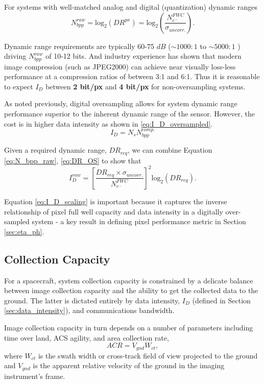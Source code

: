 \documentclass[10pt,journal]{IEEEtran}  %
\begin{document}
For systems with well-matched analog and digital (quantization) dynamic ranges
\begin{equation}
	\label{eq:N_bpp_raw}
    N_{bpp}^{raw} = \textrm{log}_2(DR^{px}) = \textrm{log}_2\left(\frac{N_{e^-}^{FWC}}{\sigma_{uncorr.}}\right).
\end{equation}

Dynamic range requirements are typically 60-75 $dB$ ($\sim 1000:1$ to $\sim 5000:1$ ) driving $N_{bpp}^{raw}$ of 10-12 bits.  And industry experience has shown that modern image compression (such as JPEG2000) can achieve near visually loss-less performance at a compression ratios of between 3:1 and 6:1.  Thus it is reasonable to expect $I_D$ between \textbf{2 bit/px} and \textbf{4 bit/px} for non-oversampling systems.

As noted previously, digital oversampling allows for system dynamic range performance superior to the inherent dynamic range of the sensor.  However, the cost is in higher data intensity as shown in \eqref{eq:I_D_oversampled}.  
\begin{equation}
	\label{eq:I_D_oversampled}
    I_D = N_s N_{bpp}^{comp.} 
\end{equation}

Given a required dynamic range, $DR_{req}$, we can combine Equation \eqref{eq:N_bpp_raw}, \eqref{eq:DR_OS} to show that
\begin{equation}
    \label{eq:I_D_scaling}
    I_D^{raw} = \left[\frac{DR_{req}\times \sigma_{uncorr.}}{N_{e^-}^{FWC}}\right]^2 \textrm{log}_2 (DR_{req}).
\end{equation}

Equation \eqref{eq:I_D_scaling} is important because it captures the inverse relationship of pixel full well capacity and data intensity in a digitally over-sampled system - a key result in defining pixel performance metric in Section \ref{sec:eta_ph}.

\subsection{Collection Capacity}
\label{sec:capacity}
For a spacecraft, system collection capacity is constrained by a delicate balance between image collection capacity and the ability to get the collected data to the ground.  The latter is dictated entirely by data intensity, $I_D$ (defined in Section \ref{sec:data_intensity}), and communications bandwidth.  

Image collection capacity in turn depends on a number of parameters including time over land, ACS agility, and area collection rate,
\begin{equation}
	\label{eq:acr_def}
    ACR = V_{gnd}W_{ct},
\end{equation}
where $W_{ct}$ is the swath width or cross-track field of view projected to the ground and $V_{gnd}$ is the apparent relative velocity of the ground in the imaging instrument's frame.
\end{document}
